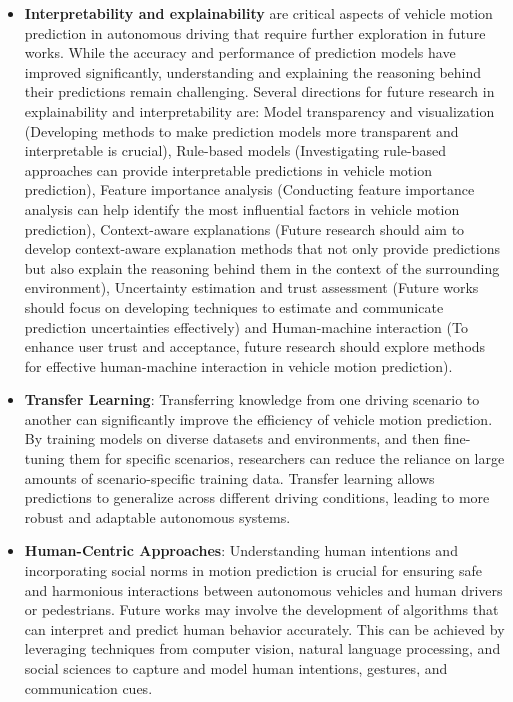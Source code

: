 \begin{itemize}
	\item \textbf{Interpretability and explainability} are critical aspects of vehicle motion prediction in autonomous driving that require further exploration in future works. While the accuracy and performance of prediction models have improved significantly, understanding and explaining the reasoning behind their predictions remain challenging. Several directions for future research in explainability and interpretability are: Model transparency and visualization (Developing methods to make prediction models more transparent and interpretable is crucial), Rule-based models (Investigating rule-based approaches can provide interpretable predictions in vehicle motion prediction), Feature importance analysis (Conducting feature importance analysis can help identify the most influential factors in vehicle motion prediction), Context-aware explanations (Future research should aim to develop context-aware explanation methods that not only provide predictions but also explain the reasoning behind them in the context of the surrounding environment), Uncertainty estimation and trust assessment (Future works should focus on developing techniques to estimate and communicate prediction uncertainties effectively) and Human-machine interaction (To enhance user trust and acceptance, future research should explore methods for effective human-machine interaction in vehicle motion prediction).
	
	\item \textbf{Transfer Learning}: Transferring knowledge from one driving scenario to another can significantly improve the efficiency of vehicle motion prediction. By training models on diverse datasets and environments, and then fine-tuning them for specific scenarios, researchers can reduce the reliance on large amounts of scenario-specific training data. Transfer learning allows predictions to generalize across different driving conditions, leading to more robust and adaptable autonomous systems.
	
	\item \textbf{Human-Centric Approaches}: Understanding human intentions and incorporating social norms in motion prediction is crucial for ensuring safe and harmonious interactions between autonomous vehicles and human drivers or pedestrians. Future works may involve the development of algorithms that can interpret and predict human behavior accurately. This can be achieved by leveraging techniques from computer vision, natural language processing, and social sciences to capture and model human intentions, gestures, and communication cues.
	

\end{itemize}

